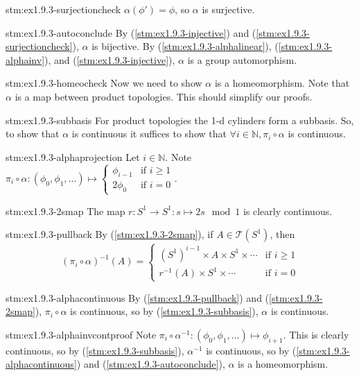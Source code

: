 \begin{statement}{stm:ex1.9.3-surjectioncheck}
$\alpha(\phi') = \phi$, so $\alpha$ is surjective.
\end{statement}

\begin{statement}{stm:ex1.9.3-autoconclude}
By (\ref{stm:ex1.9.3-injective}) and (\ref{stm:ex1.9.3-surjectioncheck}), $\alpha$ is bijective. By (\ref{stm:ex1.9.3-alphalinear}), (\ref{stm:ex1.9.3-alphainv}), and (\ref{stm:ex1.9.3-injective}), $\alpha$ is a group automorphism.
\end{statement} 

\begin{explanation}{stm:ex1.9.3-homeocheck}
Now we need to show $\alpha$ is a homeomorphism. Note that $\alpha$ is a map between product topologies. This should simplify our proofs.
\end{explanation}

\begin{statement}{stm:ex1.9.3-subbasis}
For product topologies the 1-d cylinders form a subbasis. So, to show that $\alpha$ is continuous it suffices to show that $\forall i \in \mathbb{N}, \pi_i \circ \alpha$ is continuous.
\end{statement}

\begin{statement}{stm:ex1.9.3-alphaprojection}
Let $i \in \mathbb{N}$. Note $\pi_i \circ \alpha : (\phi_0, \phi_1, \dots) \mapsto \begin{cases} \phi_{i-1} & \text{if } i \ge 1 \\ 2\phi_0 & \text{if } i = 0 \end{cases}$.
\end{statement}

\begin{statement}{stm:ex1.9.3-2smap}
The map $r : S^1 \to S^1 : s \mapsto 2s \mod 1$ is clearly continuous.
\end{statement}

\begin{statement}{stm:ex1.9.3-pullback}
By (\ref{stm:ex1.9.3-2smap}), if $A \in \mathcal{T}(S^1)$, then 
\[
(\pi_i \circ \alpha)^{-1}(A) = 
\begin{cases}
(S^1)^{i-1} \times A \times S^1 \times \cdots & \text{if } i \ge 1 \\
r^{-1}(A) \times S^1 \times \cdots & \text{if } i = 0
\end{cases}
\]
\end{statement}

\begin{statement}{stm:ex1.9.3-alphacontinuous}
By (\ref{stm:ex1.9.3-pullback}) and (\ref{stm:ex1.9.3-2smap}), $\pi_i \circ \alpha$ is continuous, so by (\ref{stm:ex1.9.3-subbasis}), $\alpha$ is continuous.
\end{statement}

\begin{statement}{stm:ex1.9.3-alphainvcontproof}
Note $\pi_i \circ \alpha^{-1} : (\phi_0, \phi_1, \dots) \mapsto \phi_{i+1}$. This is clearly continuous, so by (\ref{stm:ex1.9.3-subbasis}), $\alpha^{-1}$ is continuous, so by (\ref{stm:ex1.9.3-alphacontinuous}) and (\ref{stm:ex1.9.3-autoconclude}), $\alpha$ is a homeomorphism.
\end{statement}
